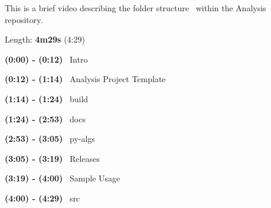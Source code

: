 

This is a brief video describing the folder structure~\newline
 within the Analysis repository.

Length\+: {\bfseries{4m29s}} (4\+:29)

{\bfseries{(0\+:00) -\/ (0\+:12)}}~\newline
 Intro

{\bfseries{(0\+:12) -\/ (1\+:14)}}~\newline
 Analysis Project Template

{\bfseries{(1\+:14) -\/ (1\+:24)}}~\newline
 build

{\bfseries{(1\+:24) -\/ (2\+:53)}}~\newline
 docs

{\bfseries{(2\+:53) -\/ (3\+:05)}}~\newline
 py-\/algs

{\bfseries{(3\+:05) -\/ (3\+:19)}}~\newline
 Releases

{\bfseries{(3\+:19) -\/ (4\+:00)}}~\newline
 Sample Usage

{\bfseries{(4\+:00) -\/ (4\+:29)}}~\newline
 src 